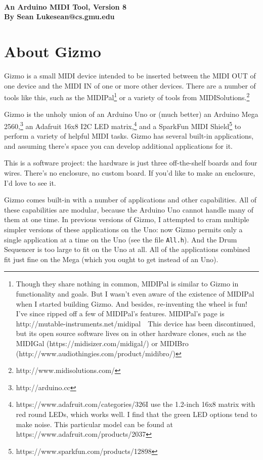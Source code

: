 \documentclass{article}
\begin{document}
\\[0.5em]
{\large \bf An Arduino MIDI Tool, Version 8\\
By Sean Luke\quad sean@cs.gmu.edu} 
\\

\vspace{-1em}
\setcounter{tocdepth}{2}
\tableofcontents
\clearpage

\section{About Gizmo}

\noindent Gizmo is a small MIDI device intended to be inserted between the MIDI OUT of one device and the MIDI IN of one or more other devices.  There are a number of tools like this, such as the MIDIPal\footnote{Though they share nothing in common, MIDIPal is similar to Gizmo in functionality and goals.  But I wasn't even aware of the existence of MIDIPal when I started building Gizmo.  And besides, re-inventing the wheel is fun!  I've since ripped off a few of MIDIPal's features.  MIDIPal's page is http:/\!/mutable-instruments.net/midipal\ \ This device has been discontinued, but its open source software lives on in other hardware clones, such as the MIDIGal (https:/\!/midisizer.com/midigal/) or MIDIBro (http:/\!/www.audiothingies.com/product/midibro/)} or a variety of tools from MIDISolutions.\footnote{http:/\!/www.midisolutions.com/}

Gizmo is the unholy union of an Arduino Uno or (much better) an Arduino Mega 2560,\footnote{http:/\!/arduino.cc} an Adafruit 16x8 I2C LED matrix,\footnote{https:/\!/www.adafruit.com/categories/326\quad I use the 1.2-inch 16x8 matrix with red round LEDs, which works well.    I find that the green LED options tend to make noise.  This particular model can be found at https:/\!/www.adafruit.com/products/2037} and a SparkFun MIDI Shield\footnote{https:/\!/www.sparkfun.com/products/12898} to perform a variety of helpful MIDI tasks.  Gizmo has several built-in applications, and assuming there's space you can develop additional applications for it.

This is a software project: the hardware is just three off-the-shelf boards and four wires.  There's no enclosure, no custom board.  If you'd like to make an enclosure, I'd love to see it.

Gizmo comes built-in with a number of applications and other capabilities.  All of these capabilities are modular, because the Arduino Uno cannot handle many of them at one time.  In previous versions of Gizmo, I attempted to cram multiple simpler versions of these applications on the Uno: now Gizmo permits only a single application at a time on the Uno (see the file \texttt{All.h}).  And the Drum Sequencer is too large to fit on the Uno at all.  All of the applications combined fit just fine on the Mega (which you ought to get instead of an Uno).
\end{document}
